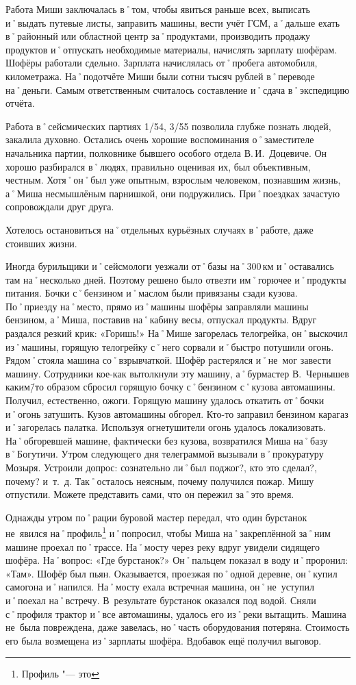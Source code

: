 Работа Миши заключалась в˚том, чтобы явиться раньше всех, выписать и˚выдать путевые листы, заправить машины, вести учёт ГСМ, а˚дальше ехать в˚районный или областной центр за˚продуктами, производить продажу продуктов и˚отпускать необходимые материалы, начислять зарплату шофёрам. Шофёры работали сдельно. Зарплата начислялась от˚пробега автомобиля, километража. На˚подотчёте Миши были сотни тысяч рублей в˚переводе на˚деньги. Самым ответственным считалось составление и˚сдача в˚экспедицию отчёта.

Работа в˚сейсмических партиях 1/54, 3/55 позволила глубже познать людей, закалила духовно. Остались очень хорошие воспоминания о˚заместителе начальника партии, полковнике бывшего особого отдела В.\,И.~Доцевиче. Он хорошо разбирался в˚людях, правильно оценивая их, был объективным, честным. Хотя˚он˚был уже опытным, взрослым человеком, познавшим жизнь, а˚Миша несмышлёным парнишкой, они подружились. При˚поездках зачастую сопровождали друг друга.

Хотелось остановиться на˚отдельных курьёзных случаях в˚работе, даже стоивших жизни. 

Иногда бурильщики и˚сейсмологи уезжали от˚базы на˚300\,км и˚оставались там на˚несколько дней. Поэтому решено было отвезти им˚горючее и˚продукты питания. Бочки с˚бензином и˚маслом были привязаны сзади кузова. По˚приезду на˚место, прямо из˚машины шофёры заправляли машины бензином, а˚Миша, поставив на˚кабину весы, отпускал продукты. Вдруг раздался резкий крик: «Горишь!» На˚Мише загорелась телогрейка, он˚выскочил из˚машины, горящую телогрейку с˚него сорвали и˚быстро потушили огонь. Рядом˚стояла машина со˚взрывчаткой. Шофёр растерялся и˚не~мог завести машину. Сотрудники кое-как вытолкнули эту машину, а˚бурмастер В.~Чернышев каким\=/то образом сбросил горящую бочку с˚бензином с˚кузова автомашины. Получил, естественно, ожоги. Горящую машину удалось откатить от˚бочки и˚огонь затушить. Кузов автомашины обгорел. Кто-то заправил бензином карагаз и˚загорелась палатка. Используя огнетушители огонь удалось локализовать. На˚обгоревшей машине, фактически без кузова, возвратился Миша на˚базу в˚Богутичи. Утром следующего дня телеграммой вызывали в˚прокуратуру Мозыря. Устроили допрос: сознательно ли˚был поджог?, кто это сделал?, почему? и~т.~д. Так˚осталось неясным, почему получился пожар. Мишу отпустили. Можете представить сами, что он пережил за˚это время.

Однажды утром по˚рации буровой мастер передал, что один бурстанок не~явился на˚профиль\footnote{Профиль "--- это } и˚попросил, чтобы Миша на˚закреплённой за˚ним машине проехал по˚трассе. На˚мосту через реку вдруг увидели сидящего шофёра. На˚вопрос: «Где бурстанок?» Он˚пальцем показал в воду и˚проронил: «Там». Шофёр был пьян. Оказывается, проезжая по˚одной деревне, он˚купил самогона и˚напился. На˚мосту ехала встречная машина, он˚не~уступил и˚поехал на˚встречу. В~результате бурстанок оказался под водой. Сняли с˚профиля трактор и˚все автомашины, удалось его из˚реки вытащить. Машина не~была повреждена, даже завелась, но˚часть оборудования потеряна. Стоимость его была возмещена из˚зарплаты шофёра. Вдобавок ещё получил выговор. 

